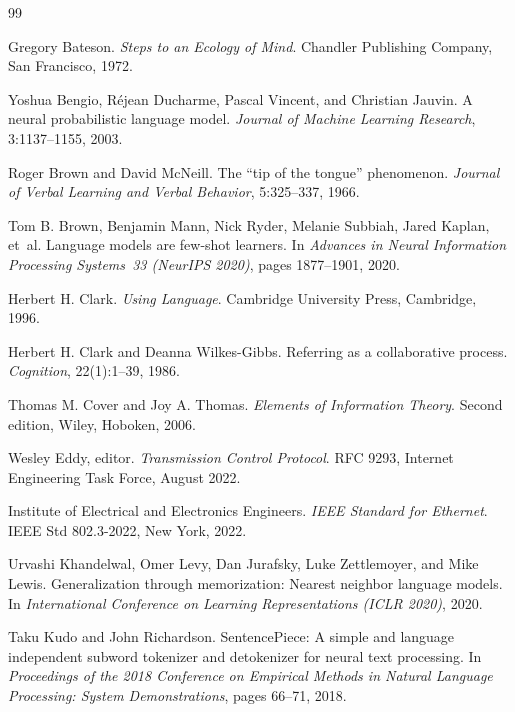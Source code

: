 \documentclass[11pt,a4paper]{article}
\theoremstyle{remark}\newtheorem{remark}[definition]{Remark}
\begin{document}
\begin{thebibliography}{99}

Gregory Bateson.
\newblock \emph{Steps to an Ecology of Mind}.
\newblock Chandler Publishing Company, San Francisco, 1972.

Yoshua Bengio, R\'ejean Ducharme, Pascal Vincent, and Christian Jauvin.
\newblock A neural probabilistic language model.
\newblock \emph{Journal of Machine Learning Research}, 3:1137--1155, 2003.

Roger Brown and David McNeill.
\newblock The ``tip of the tongue'' phenomenon.
\newblock \emph{Journal of Verbal Learning and Verbal Behavior}, 5:325--337, 1966.

Tom B. Brown, Benjamin Mann, Nick Ryder, Melanie Subbiah, Jared Kaplan, et~al.
\newblock Language models are few-shot learners.
\newblock In \emph{Advances in Neural Information Processing Systems~33 (NeurIPS 2020)}, pages 1877--1901, 2020.

Herbert H. Clark.
\newblock \emph{Using Language}.
\newblock Cambridge University Press, Cambridge, 1996.

Herbert H. Clark and Deanna Wilkes-Gibbs.
\newblock Referring as a collaborative process.
\newblock \emph{Cognition}, 22(1):1--39, 1986.

Thomas M. Cover and Joy A. Thomas.
\newblock \emph{Elements of Information Theory}.
\newblock Second edition, Wiley, Hoboken, 2006.

Wesley Eddy, editor.
\newblock \emph{Transmission Control Protocol}.
\newblock RFC 9293, Internet Engineering Task Force, August 2022.

Institute of Electrical and Electronics Engineers.
\newblock \emph{IEEE Standard for Ethernet}.
\newblock IEEE Std 802.3-2022, New York, 2022.

Urvashi Khandelwal, Omer Levy, Dan Jurafsky, Luke Zettlemoyer, and Mike Lewis.
\newblock Generalization through memorization: Nearest neighbor language models.
\newblock In \emph{International Conference on Learning Representations (ICLR 2020)}, 2020.

Taku Kudo and John Richardson.
\newblock SentencePiece: A simple and language independent subword tokenizer and detokenizer for neural text processing.
\newblock In \emph{Proceedings of the 2018 Conference on Empirical Methods in Natural Language Processing: System Demonstrations}, pages 66--71, 2018.


\end{thebibliography}
\end{document}
